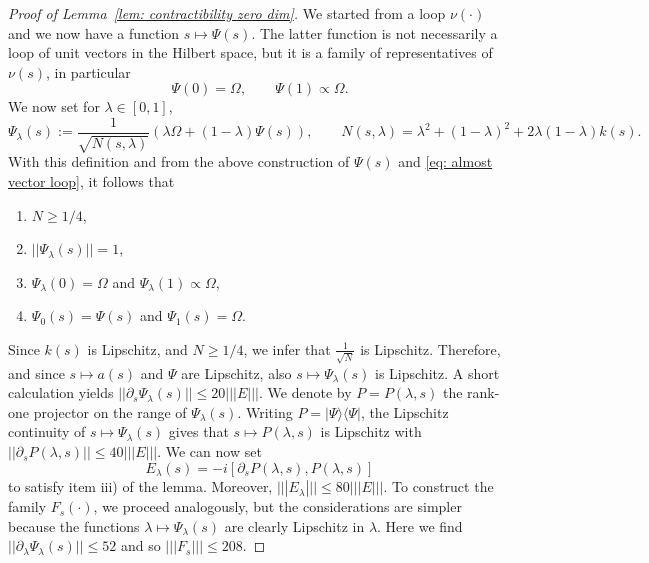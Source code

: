 \begin{proof}[Proof of Lemma~\ref{lem: contractibility zero dim}]
	We started from a loop $\nu(\cdot)$ and we now have a function $s\mapsto \Psi(s)$. The latter function is not necessarily a loop of unit vectors in the Hilbert space, but it is a family of representatives of $\nu(s)$, in particular 
	\begin{equation}\label{eq: almost vector loop}
		\Psi(0) = \Omega,\qquad \Psi(1) \propto \Omega.
	\end{equation}
	We now set for $\lambda\in[0,1]$,
	$$
	\Psi_\lambda(s):= \frac{1}{\sqrt{N(s,\lambda)}} \left(\lambda\Omega +  (1-\lambda) \Psi(s) \right),    \qquad  N(s,\lambda) = \lambda^2+(1-\lambda)^2+2\lambda(1-\lambda)k(s).
	$$
	With this definition and from the above construction of $\Psi(s)$ and \eqref{eq: almost vector loop}, it follows that 
	\begin{enumerate}
		\item $N \geq 1/4$,
		\item $||\Psi_\lambda(s)||=1$,
		\item $\Psi_\lambda(0) = \Omega$ and   $\Psi_\lambda(1)\propto \Omega$,
		\item $\Psi_0(s)=\Psi(s)$ and  $\Psi_1(s)=\Omega$.
	\end{enumerate}
	Since $k(s)$ is Lipschitz, and $N\geq 1/4$, we infer that $\frac{1}{\sqrt{N}}$ is Lipschitz. Therefore, and since $s\mapsto a(s)$ and $\Psi$ are Lipschitz, also $s\mapsto \Psi_\lambda(s)$ is Lipschitz. A short calculation yields $||\partial_s\Psi_\lambda(s)|| \leq 20 |||E|||$. We denote by $P=P(\lambda,s)$ the rank-one projector on the range of $\Psi_\lambda(s)$. Writing $P=|\Psi\rangle\langle\Psi|$, the Lipschitz continuity of $s\mapsto \Psi_\lambda(s)$ gives that $s\mapsto P(\lambda,s)$ is Lipschitz with $|| \partial_sP(\lambda,s) || \leq 40 |||E|||$. 
	We can now set
	$$
	E_\lambda(s)= -i [\partial_sP(\lambda,s) ,P(\lambda,s)]
	$$
	to satisfy item iii) of the lemma. Moreover, $||| E_\lambda |||\leq 80 |||E|||$.
	To construct the family $F_s(\cdot)$, we proceed analogously, but the considerations are simpler because the functions $\lambda\mapsto \Psi_\lambda(s)$ are clearly Lipschitz in $\lambda$. Here we find $||\partial_\lambda\Psi_\lambda(s)|| \leq 52$ and so $||| F_s |||\leq 208$.
\end{proof}















